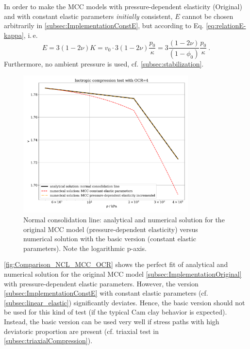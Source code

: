 \documentclass[paper=a4, twoside, pagesize]{scrartcl}
\begin{document}
In order to make the MCC models with pressure-dependent elasticity (Original) and with constant elastic parameters \emph{initially} consistent, $E$ cannot be chosen arbitrarily in \ref{subsec:ImplementationConstE}, but according to Eq. \eqref{eq:relationE-kappa}, i.\,e.
\begin{equation}
E = 3(1-2\nu) K = v_0\cdot 3(1-2\nu) \frac{p_0}{\kappa} = 3 \frac{(1-2\nu)}{(1-\phi_0)} \frac{p_0}{\kappa} \ .
\end{equation}
Furthermore, no ambient pressure is used, cf. \autoref{subsec:stabilization}.
\begin{figure}[h!]
  \includegraphics[width=0.8\textwidth]{img/SemiExplicitModifiedCamClay_OpenGeoSys2023/Comparison_NCL_MCC_new_OCR=4.pdf}
  \caption{Normal consolidation line: analytical and numerical solution for the original MCC model (pressure-dependent elasticity) versus numerical solution with the basic version (constant elastic parameters). Note the logarithmic p-axis.}\label{fig:Comparison_NCL_MCC_OCR}
\end{figure}
\par
\autoref{fig:Comparison_NCL_MCC_OCR} shows the perfect fit of analytical and numerical solution for the original MCC model \ref{subsec:ImplementationOriginal} with pressure-dependent elastic parameters. However, the version \ref{subsec:ImplementationConstE} with constant elastic parameters (cf. \autoref{subsec:linear_elastic}) significantly deviates. Hence, the basic version should not be used for this kind of test (if the typical Cam clay behavior is expected). Instead, the basic version can be used very well if stress paths with high deviatoric proportion are present (cf. triaxial test in \autoref{subsec:triaxialCompression}).
\end{document}
